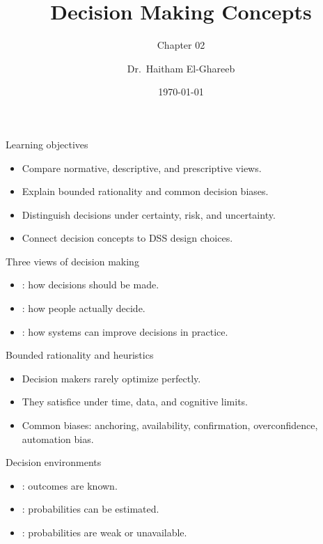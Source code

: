 \documentclass[aspectratio=169,11pt]{beamer}
\title[Decision Concepts]{Decision Making Concepts}
\subtitle{Chapter 02}
\author{Dr.\ Haitham El-Ghareeb}
\institute{Faculty of Computers and Information Sciences}
\date{\today}
\begin{document}
\begin{frame}
  \titlepage
\end{frame}

\begin{frame}{Learning objectives}
  \begin{itemize}
    \item Compare normative, descriptive, and prescriptive views.
    \item Explain bounded rationality and common decision biases.
    \item Distinguish decisions under certainty, risk, and uncertainty.
    \item Connect decision concepts to DSS design choices.
  \end{itemize}
\end{frame}

\begin{frame}{Three views of decision making}
  \begin{itemize}
    \item {}: how decisions should be made.
    \item {}: how people actually decide.
    \item {}: how systems can improve decisions in
    practice.
  \end{itemize}
\end{frame}

\begin{frame}{Bounded rationality and heuristics}
  \begin{itemize}
    \item Decision makers rarely optimize perfectly.
    \item They satisfice under time, data, and cognitive limits.
    \item Common biases: anchoring, availability, confirmation, overconfidence,
    automation bias.
  \end{itemize}
\end{frame}

\begin{frame}{Decision environments}
  \begin{itemize}
    \item {}: outcomes are known.
    \item {}: probabilities can be estimated.
    \item {}: probabilities are weak or unavailable.
  \end{itemize}
\end{frame}
\end{document}
